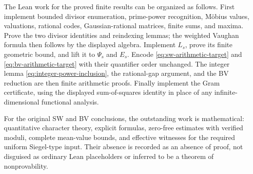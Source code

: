 The Lean work for the proved finite results can be organized as follows.
First implement bounded divisor enumeration, prime-power recognition,
M\"obius values, valuations, rational codes, Gaussian-rational matrices,
finite sums, and maxima. Prove the two divisor identities and reindexing
lemmas; the weighted Vaughan formula then follows by the displayed
algebra. Implement $L_s$, prove its finite geometric bound, and lift it
to $\Psi_s$ and $E_s$. Encode
\eqref{eq:sw-arithmetic-target} and
\eqref{eq:bv-arithmetic-target} with their quantifier order unchanged.
The integer lemma \eqref{eq:integer-power-inclusion}, the rational-gap
argument, and the BV reduction are then finite arithmetic proofs.
Finally implement the Gram certificate, using the displayed
sum-of-squares identity in place of any infinite-dimensional
functional analysis.

For the original SW and BV conclusions, the outstanding work is
mathematical: quantitative character theory, explicit formulas,
zero-free estimates with verified moduli, complete mean-value bounds,
and effective witnesses for the required uniform Siegel-type input.
Their absence is recorded as an absence of proof, not disguised as
ordinary Lean placeholders or inferred to be a theorem of
nonprovability.
